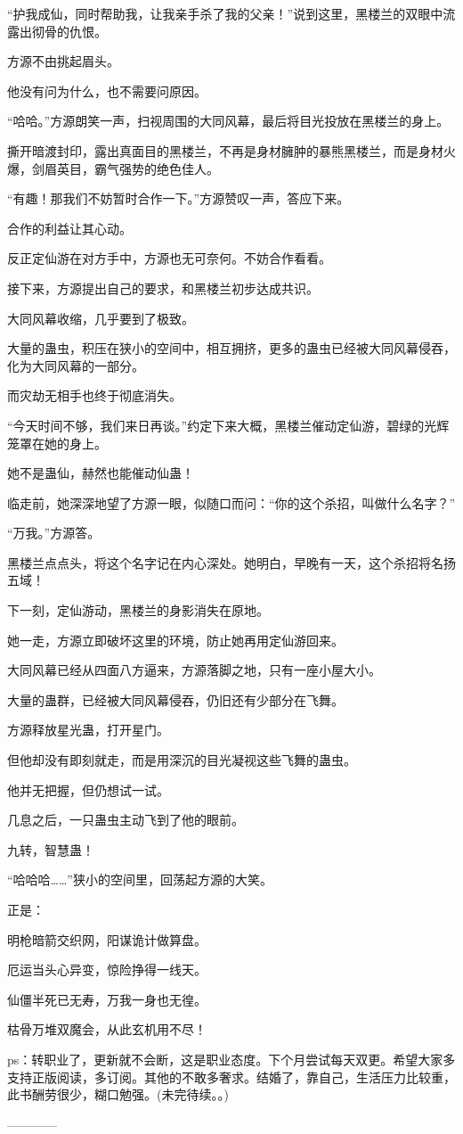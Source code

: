 \begin{this_body}
“护我成仙，同时帮助我，让我亲手杀了我的父亲！”说到这里，黑楼兰的双眼中流露出彻骨的仇恨。

方源不由挑起眉头。

他没有问为什么，也不需要问原因。

“哈哈。”方源朗笑一声，扫视周围的大同风幕，最后将目光投放在黑楼兰的身上。

撕开暗渡封印，露出真面目的黑楼兰，不再是身材臃肿的暴熊黑楼兰，而是身材火爆，剑眉英目，霸气强势的绝色佳人。

“有趣！那我们不妨暂时合作一下。”方源赞叹一声，答应下来。

合作的利益让其心动。

反正定仙游在对方手中，方源也无可奈何。不妨合作看看。

接下来，方源提出自己的要求，和黑楼兰初步达成共识。

大同风幕收缩，几乎要到了极致。

大量的蛊虫，积压在狭小的空间中，相互拥挤，更多的蛊虫已经被大同风幕侵吞，化为大同风幕的一部分。

而灾劫无相手也终于彻底消失。

“今天时间不够，我们来日再谈。”约定下来大概，黑楼兰催动定仙游，碧绿的光辉笼罩在她的身上。

她不是蛊仙，赫然也能催动仙蛊！

临走前，她深深地望了方源一眼，似随口而问：“你的这个杀招，叫做什么名字？”

“万我。”方源答。

黑楼兰点点头，将这个名字记在内心深处。她明白，早晚有一天，这个杀招将名扬五域！

下一刻，定仙游动，黑楼兰的身影消失在原地。

她一走，方源立即破坏这里的环境，防止她再用定仙游回来。

大同风幕已经从四面八方逼来，方源落脚之地，只有一座小屋大小。

大量的蛊群，已经被大同风幕侵吞，仍旧还有少部分在飞舞。

方源释放星光蛊，打开星门。

但他却没有即刻就走，而是用深沉的目光凝视这些飞舞的蛊虫。

他并无把握，但仍想试一试。

几息之后，一只蛊虫主动飞到了他的眼前。

九转，智慧蛊！

“哈哈哈……”狭小的空间里，回荡起方源的大笑。

正是：

明枪暗箭交织网，阳谋诡计做算盘。

厄运当头心异变，惊险挣得一线天。

仙僵半死已无寿，万我一身也无徨。

枯骨万堆双魔会，从此玄机用不尽！

ps：转职业了，更新就不会断，这是职业态度。下个月尝试每天双更。希望大家多支持正版阅读，多订阅。其他的不敢多奢求。结婚了，靠自己，生活压力比较重，此书酬劳很少，糊口勉强。(未完待续。。)

------------

\end{this_body}

